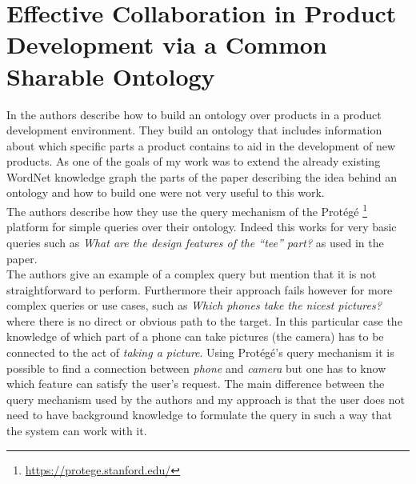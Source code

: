 \section{Effective Collaboration in Product Development via a
Common Sharable Ontology}
\label{section:share}
In \cite{mostefai2005effective} the authors describe how to build an ontology over products in a product development environment. They build an ontology that includes information about which specific parts a product contains to aid in the development of new products. As one of the goals of my work was to extend the already existing WordNet knowledge graph the parts of the paper describing the idea behind an ontology and how to build one were not very useful to this work.\\
The authors describe how they use the query mechanism of the Protégé \footnote{\url{https://protege.stanford.edu/}} platform for simple queries over their ontology. Indeed this works for very basic queries such as \textit{What are the design features of the “tee” part?} as used in the paper.\\
The authors give an example of a complex query but mention that it is not straightforward to perform. Furthermore their approach fails however for more complex queries or use cases, such as \textit{Which phones take the nicest pictures?} where there is no direct or obvious path to the target. In this particular case the knowledge of which part of a phone can take pictures (the camera) has to be connected to the act of \textit{taking a picture}. Using Protégé's query mechanism it is possible to find a connection between \textit{phone} and \textit{camera} but one has to know which feature can satisfy the user's request. The main difference between the query mechanism used by the authors and my approach is that the user does not need to have background knowledge to formulate the query in such a way that the system can work with it.

